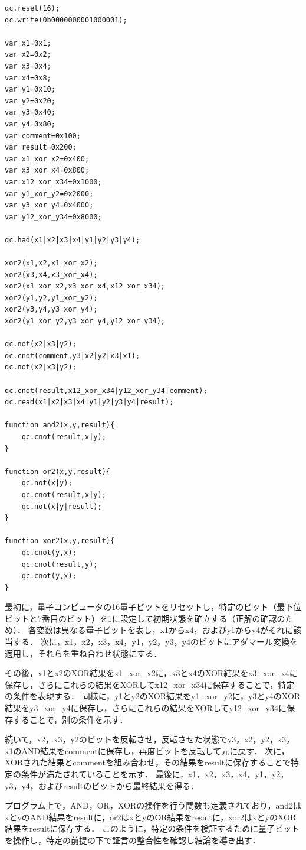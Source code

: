 \documentclass[titlepage,a4paper]{jsarticle}
\begin{document}
\begin{lstlisting}[caption=2人用QCEngin,label=4:ソースコード]
  qc.reset(16);         
qc.write(0b0000000001000001);         

var x1=0x1;
var x2=0x2;
var x3=0x4;
var x4=0x8;
var y1=0x10;
var y2=0x20;
var y3=0x40;
var y4=0x80;
var comment=0x100;
var result=0x200;
var x1_xor_x2=0x400;
var x3_xor_x4=0x800;
var x12_xor_x34=0x1000;
var y1_xor_y2=0x2000;
var y3_xor_y4=0x4000;
var y12_xor_y34=0x8000;

qc.had(x1|x2|x3|x4|y1|y2|y3|y4);

xor2(x1,x2,x1_xor_x2);
xor2(x3,x4,x3_xor_x4);
xor2(x1_xor_x2,x3_xor_x4,x12_xor_x34);
xor2(y1,y2,y1_xor_y2);
xor2(y3,y4,y3_xor_y4);
xor2(y1_xor_y2,y3_xor_y4,y12_xor_y34);

qc.not(x2|x3|y2);
qc.cnot(comment,y3|x2|y2|x3|x1);
qc.not(x2|x3|y2);

qc.cnot(result,x12_xor_x34|y12_xor_y34|comment);
qc.read(x1|x2|x3|x4|y1|y2|y3|y4|result);

function and2(x,y,result){
    qc.cnot(result,x|y);
}

function or2(x,y,result){
    qc.not(x|y);
    qc.cnot(result,x|y);
    qc.not(x|y|result);
}

function xor2(x,y,result){
    qc.cnot(y,x);
    qc.cnot(result,y);
    qc.cnot(y,x);
}
\end{lstlisting}
最初に，量子コンピュータの16量子ビットをリセットし，特定のビット（最下位ビットと7番目のビット）を1に設定して初期状態を確立する（正解の確認のため）．
各変数は異なる量子ビットを表し，x1からx4，およびy1からy4がそれに該当する．
次に，x1，x2，x3，x4，y1，y2，y3，y4のビットにアダマール変換を適用し，それらを重ね合わせ状態にする．

その後，x1とx2のXOR結果をx1\_xor\_x2に，x3とx4のXOR結果をx3\_xor\_x4に保存し，さらにこれらの結果をXORしてx12\_xor\_x34に保存することで，特定の条件を表現する．
同様に，y1とy2のXOR結果をy1\_xor\_y2に，y3とy4のXOR結果をy3\_xor\_y4に保存し，さらにこれらの結果をXORしてy12\_xor\_y34に保存することで，別の条件を示す．

続いて，x2，x3，y2のビットを反転させ，反転させた状態でy3，x2，y2，x3，x1のAND結果をcommentに保存し，再度ビットを反転して元に戻す．
次に，XORされた結果とcommentを組み合わせ，その結果をresultに保存することで特定の条件が満たされていることを示す．
最後に，x1，x2，x3，x4，y1，y2，y3，y4，およびresultのビットから最終結果を得る．

プログラム上で，AND，OR，XORの操作を行う関数も定義されており，and2はxとyのAND結果をresultに，or2はxとyのOR結果をresultに，xor2はxとyのXOR結果をresultに保存する．
このように，特定の条件を検証するために量子ビットを操作し，特定の前提の下で証言の整合性を確認し結論を導き出す．
\end{document}

